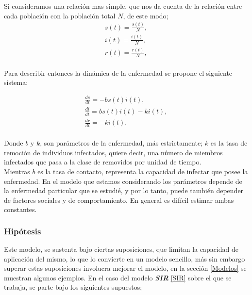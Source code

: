 \documentclass[journal]{IEEEtran}
\begin{document}
Si consideramos una relación mas simple, que nos da cuenta de la relación entre cada población con la población total $N$, de este modo;
\begin{equation*}
  \begin{split}
s(t) = \frac{s(t)}{N},\\
i(t) = \frac{i(t)}{N},\\
r(t) = \frac{r(t)}{N},\\
  \end{split}
\end{equation*} 

Para describir entonces la dinámica de la enfermedad se propone el siguiente sistema:  

\begin{equation}\label{SIR}
  \begin{split}
\frac{ds}{dt} = -bs(t)i(t),\\
\frac{di}{dt} = bs(t)i(t)-ki(t),\\
\frac{dr}{dt} = -ki(t),\\
  \end{split}
\end{equation}

Donde $b$ y $k$, son parámetros de la enfermedad, más estrictamente; $k$ es la tasa de remoción de individuos infectados, quiere decir, una
número de miembros infectados que pasa a la clase de removidos por unidad de tiempo.\\ 
Mientras $b$ es la tasa de contacto, representa la capacidad de infectar que posee la enfermedad. En el modelo que estamos considerando los parámetros depende de la enfermedad
particular que se estudié, y por lo tanto, puede también depender de factores sociales y
de comportamiento. En general es difícil estimar ambas constantes.

\subsubsection{Hipótesis}
Este modelo, se sustenta bajo ciertas suposiciones, que limitan la capacidad de aplicación del mismo, lo que lo convierte en un modelo sencillo,
más sin embargo superar estas suposiciones involucra mejorar el modelo, en la sección \ref{Modelos} se muestran algunos ejemplos. En el caso del modelo \textbf{\textit{SIR}} \ref{SIR}
sobre el que se trabaja, se parte bajo los siguientes supuestos;
\end{document}
